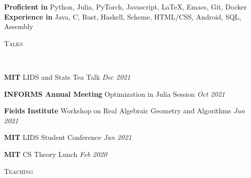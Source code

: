 \documentclass[9pt]{article}
\newenvironment{changemargin}[2]{%
  \begin{list}{}{%
      \setlength{\topsep}{0pt}%
      \setlength{\leftmargin}{#1}%
      \setlength{\rightmargin}{#2}%
      \setlength{\listparindent}{\parindent}%
      \setlength{\itemindent}{\parindent}%
      \setlength{\parsep}{\parskip}%
    }%
  \item[]}{\end{list}
}
\newcommand{\lineover}{
  \begin{changemargin}{-0.05in}{-0.05in}
    \vspace*{-8pt}
    \hrulefill \\
    \vspace*{-2pt}
  \end{changemargin}
}
\newcommand{\header}[1]{
  \begin{changemargin}{-0.5in}{-0.5in}
    \scshape{#1}\\
    \lineover
  \end{changemargin}
}
\newenvironment{body} {
  \vspace*{-16pt}
  \begin{changemargin}{-0.25in}{-0.5in}
  }
  {\end{changemargin}
}
\begin{document}
\begin{body}
  \vspace{14pt}
  \textbf{Proficient in} Python, Julia, PyTorch, Javascript, \LaTeX, Emacs, Git, Docker \\
  \smallskip
  \textbf{Experience in} Java, C, Rust, Haskell, Scheme, HTML/CSS, Android, SQL,
  Assembly
\end{body}

\smallskip


\header{Talks}
\begin{body}
  \vspace{14pt}

  \textbf{MIT} LIDS and Stats Tea Talk \hfill{} \emph{Dec 2021}\\
  \smallskip

  \textbf{INFORMS Annual Meeting} Optimization in Julia Session \hfill{} \emph{Oct 2021} \\
  \smallskip

  \textbf{Fields Institute} Workshop on Real Algebraic Geometry and Algorithms
   \hfill{} \emph{Jun 2021}\\
  \smallskip

  \textbf{MIT} LIDS Student Conference \hfill{} \emph{Jan 2021}\\
  \smallskip

  \textbf{MIT} CS Theory Lunch \hfill{} \emph{Feb 2020}\\
  \smallskip
\end{body}

\smallskip



\header{Teaching }
\end{document}

